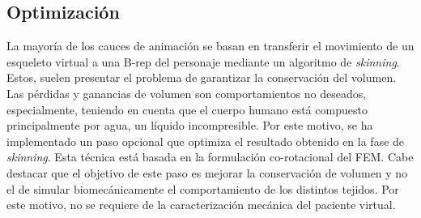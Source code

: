 

 \subsection{Optimización}
\label{posing:optimizacion}


La mayoría de los cauces de animación se basan en transferir el movimiento de un esqueleto virtual a una \acl{B-rep} del personaje mediante un algoritmo de \emph{skinning}. Estos, suelen presentar el problema de garantizar la conservación del volumen. Las pérdidas y ganancias de volumen son comportamientos no deseados, especialmente, teniendo en cuenta que el cuerpo humano está compuesto principalmente por agua, un líquido incompresible. Por este motivo, se ha implementado un paso opcional que optimiza el resultado obtenido en la fase de \emph{skinning}. Esta técnica está basada en la formulación co-rotacional del \ac{FEM}. Cabe destacar que el objetivo de este paso es mejorar la conservación de volumen y no el de simular biomecánicamente el comportamiento de los distintos tejidos. Por este motivo, no se requiere de la caracterización mecánica del paciente virtual.  




